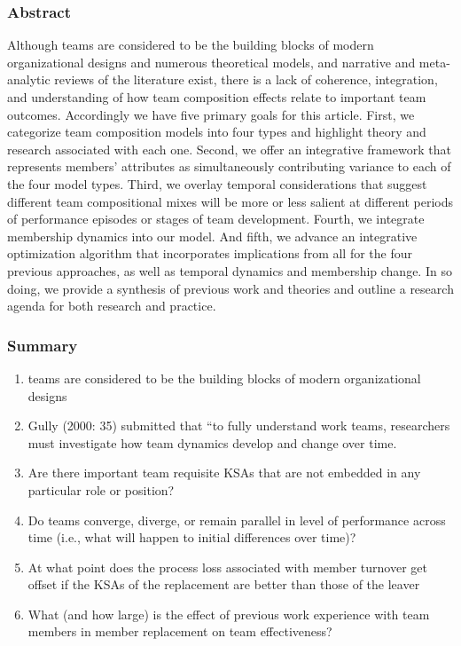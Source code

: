 \documentclass[12pt]{article}
\begin{document}
\subsubsection*{Abstract}
Although teams are considered to be the building blocks of modern organizational designs and numerous theoretical models, and narrative and meta-analytic reviews of the literature exist, there is a lack of coherence, integration, and understanding of how team composition effects relate to important team outcomes. Accordingly we have five primary goals for this article. First, we categorize team composition models into four types and highlight theory and research associated with each one. Second, we offer an integrative framework that represents members’ attributes as simultaneously contributing variance to each of the four model types. Third, we overlay temporal considerations that suggest different team compositional mixes will be more or less salient at different periods of performance episodes or stages of team development. Fourth, we integrate membership dynamics into our model. And fifth, we advance an integrative optimization algorithm that incorporates implications from all for the four previous approaches, as well as temporal dynamics and membership change. In so doing, we provide a synthesis of previous work and theories and outline a research agenda for both research and practice. 

\subsubsection*{Summary}
\begin{enumerate}
    \item teams are considered to be the building blocks of modern organizational designs
    \item Gully (2000: 35) submitted that “to fully understand work teams, researchers must investigate how team dynamics develop and change over time.
    \item Are there important team requisite KSAs that are not embedded in any particular role or position?
    \item Do teams converge, diverge, or remain parallel in level of performance across time (i.e., what will happen to initial differences over time)?
    \item At what point does the process loss associated with member turnover get offset if the KSAs of the replacement are better than those of the leaver
    \item What (and how large) is the effect of previous work experience with team members in member replacement on team effectiveness?
\end{enumerate}
\end{document}
